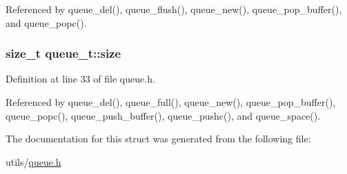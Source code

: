 Referenced by queue\-\_\-del(), queue\-\_\-flush(), queue\-\_\-new(), queue\-\_\-pop\-\_\-buffer(), and queue\-\_\-popc().

\hypertarget{structqueue__t_a83a13b888f9d4ef127d706559818b779}{
\subsubsection[{size}]{\setlength{\rightskip}{0pt plus 5cm}size\-\_\-t queue\-\_\-t\-::size}}\label{structqueue__t_a83a13b888f9d4ef127d706559818b779}


Definition at line 33 of file queue.\-h.



Referenced by queue\-\_\-del(), queue\-\_\-full(), queue\-\_\-new(), queue\-\_\-pop\-\_\-buffer(), queue\-\_\-popc(), queue\-\_\-push\-\_\-buffer(), queue\-\_\-pushc(), and queue\-\_\-space().



The documentation for this struct was generated from the following file\-:\begin{DoxyCompactItemize}
\item 
utils/\hyperlink{queue_8h}{queue.\-h}\end{DoxyCompactItemize}
